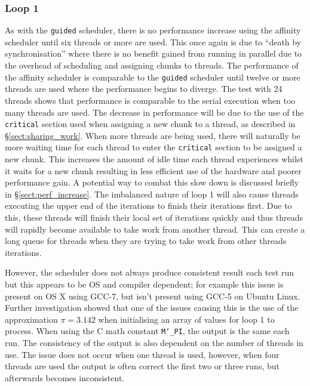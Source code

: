 \documentclass[11pt, a4paper]{article}
\begin{document}
			\subsubsection{Loop 1} \label{sect:loop1_affinity}
				As with the \texttt{guided} scheduler, there is no performance increase using the affinity scheduler until six threads or more are used. This once again is due to ``death by synchronisation'' where there is no benefit gained from running in parallel due to the overhead of scheduling and assigning chunks to threads. The performance of the affinity scheduler is comparable to the \texttt{guided} scheduler until twelve or more threads are used where the performance begins to diverge. The test with 24 threads shows that performance is comparable to the serial execution when too many threads are used. The decrease in performance will be due to the use of the \texttt{critical} section used when assigning a new chunk to a thread, as described in \S\ref{sect:sharing_work}. When more threads are being used, there will naturally be more waiting time for each thread to enter the \texttt{critical} section to be assigned a new chunk. This increases the amount of idle time each thread experiences whilst it waits for a new chunk resulting in less efficient use of the hardware and poorer performance gain. A potential way to combat this slow down is discussed briefly in \S\ref{sect:perf_increase}. The imbalanced nature of loop 1 will also cause threads executing the upper end of the iterations to finish their iterations first. Due to this, these threads will finish their local set of iterations quickly and thus threads will rapidly become available to take work from another thread. This can create a long queue for threads when they are trying to take work from other threads iterations. 
				
				However, the scheduler does not always produce consistent result each test run but this appears to be OS and compiler dependent; for example this issue is present on OS X using GCC-7, but isn't present using GCC-5 on Ubuntu Linux. Further investigation showed that one of the issues causing this is the use of the approximation $\pi = 3.142$ when initialising an array of values for loop 1 to process. When using the C math constant \texttt{M\char`_PI}, the output is the same each run. The consistency of the output is also dependent on the number of threads in use. The issue does not occur when one thread is used, however, when four threads are used the output is often correct the first two or three runs, but afterwards becomes inconsistent.
				
\end{document}
